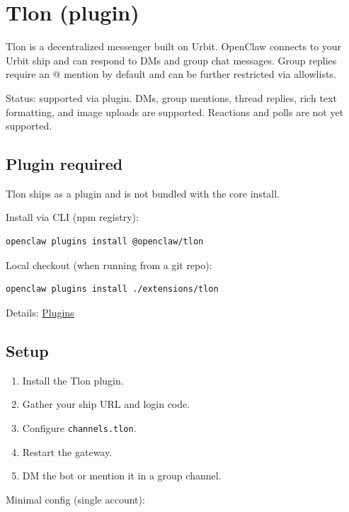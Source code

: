 \clearpage

\section{Tlon (plugin)}


Tlon is a decentralized messenger built on Urbit. OpenClaw connects to your Urbit ship and can
respond to DMs and group chat messages. Group replies require an @ mention by default and can
be further restricted via allowlists.

Status: supported via plugin. DMs, group mentions, thread replies, rich text formatting, and
image uploads are supported. Reactions and polls are not yet supported.

\subsection{Plugin required}


Tlon ships as a plugin and is not bundled with the core install.

Install via CLI (npm registry):

\begin{lstlisting}[language=bash]
openclaw plugins install @openclaw/tlon
\end{lstlisting}


Local checkout (when running from a git repo):

\begin{lstlisting}[language=bash]
openclaw plugins install ./extensions/tlon
\end{lstlisting}


Details: \href{/tools/plugin}{Plugins}

\subsection{Setup}


\begin{enumerate}
  \item Install the Tlon plugin.
  \item Gather your ship URL and login code.
  \item Configure \texttt{channels.tlon}.
  \item Restart the gateway.
  \item DM the bot or mention it in a group channel.
\end{enumerate}


Minimal config (single account):

